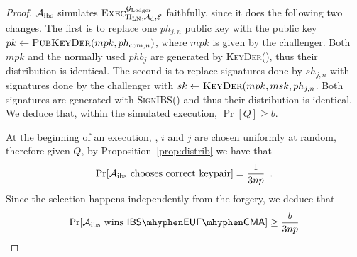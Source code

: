   \begin{proof}
    $\mathcal{A}_{\mathrm{ibs}}$ simulates
    $\textsc{Exec}^{\mathcal{G}_{\mathrm{Ledger}}}_{\Pi_{\mathrm{LN}}, \mathcal{A}_{\mathrm{d}},
    \mathcal{E}}$ faithfully, since it does the following two changes. The
    first is to replace one $ph_{j, n}$ public key with the public key $pk \gets
    \textsc{PubKeyDer}(mpk, ph_{\mathrm{com}, n})$, where $mpk$ is given by the
    challenger. Both $mpk$ and the normally used $phb_j$ are generated by
    \textsc{KeyDer}(), thus their distribution is identical. The second is to
    replace signatures done by $sh_{j, n}$ with signatures done by the
    challenger with $sk \gets \textsc{KeyDer}(mpk, msk, ph_{j, n}$. Both
    signatures are generated with \textsc{SignIBS}() and thus their distribution
    is identical. We deduce that, within the simulated execution, $\Pr[Q] \geq
    b$.

    At the beginning of an execution, \alice, $i$ and $j$ are chosen uniformly
    at random, therefore given $Q$, by Proposition~\ref{prop:distrib} we have
    that
    \begin{equation*}
      \Pr[\mathcal{A}_{\mathrm{ibs}} \text{ chooses correct keypair}] =
      \frac{1}{3np} \enspace.
    \end{equation*}
    Since the selection happens independently from the forgery, we deduce that
    \begin{equation*}
      \Pr[\adversary_{\mathrm{ibs}} \text{ wins } \mathsf{IBS \mhyphen EUF
      \mhyphen CMA}] \geq \frac{b}{3np}
    \end{equation*}
  \end{proof}

